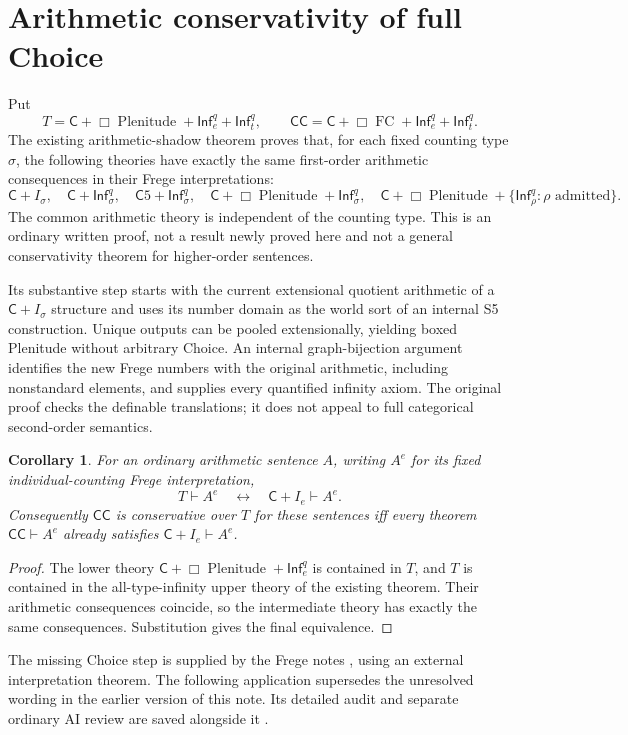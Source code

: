 \documentclass[11pt]{article}
\newcommand{\C}{\mathsf C}
\newcommand{\CC}{\mathsf{CC}}
\newcommand{\Infq}{\mathsf{Inf}^{q}}
\newtheorem{corollary}[proposition]{Corollary}
\begin{document}
\section{Arithmetic conservativity of full Choice}

Put
\[
 T=\C+\Box\operatorname{Plenitude}+\Infq_e+\Infq_t,
 \qquad
 \CC=\C+\Box\operatorname{FC}+\Infq_e+\Infq_t.
\]
The existing arithmetic-shadow theorem \cite[\S33]{coding} proves that, for each fixed counting type $\sigma$, the following theories have exactly the same first-order arithmetic consequences in their Frege interpretations:
\[
 \C+I_\sigma,\quad \C+\Infq_\sigma,\quad
 \C5+\Infq_\sigma,\quad
 \C+\Box\operatorname{Plenitude}+\Infq_\sigma,
 \quad\C+\Box\operatorname{Plenitude}+\{\Infq_\rho:\rho\text{ admitted}\}.
\]
The common arithmetic theory is independent of the counting type. This is an ordinary written proof, not a result newly proved here and not a general conservativity theorem for higher-order sentences.

Its substantive step starts with the current extensional quotient arithmetic of a $\C+I_\sigma$ structure and uses its number domain as the world sort of an internal S5 construction. Unique outputs can be pooled extensionally, yielding boxed Plenitude without arbitrary Choice. An internal graph-bijection argument identifies the new Frege numbers with the original arithmetic, including nonstandard elements, and supplies every quantified infinity axiom. The original proof checks the definable translations; it does not appeal to full categorical second-order semantics.

\begin{corollary}\label{conservationreduction}
For an ordinary arithmetic sentence $A$, writing $A^e$ for its fixed individual-counting Frege interpretation,
\[
 T\vdash A^e\quad\longleftrightarrow\quad\C+I_e\vdash A^e.
\]
Consequently $\CC$ is conservative over $T$ for these sentences iff every theorem $\CC\vdash A^e$ already satisfies $\C+I_e\vdash A^e$.
\end{corollary}
\begin{proof}
The lower theory $\C+\Box\operatorname{Plenitude}+\Infq_e$ is contained in $T$, and $T$ is contained in the all-type-infinity upper theory of the existing theorem. Their arithmetic consequences coincide, so the intermediate theory has exactly the same consequences. Substitution gives the final equivalence.
\end{proof}

The missing Choice step is supplied by the Frege notes \cite[\S36]{fregechoice}, using an external interpretation theorem. The following application supersedes the unresolved wording in the earlier version of this note. Its detailed audit and separate ordinary AI review are saved alongside it \cite{choiceaudit}.
\end{document}

